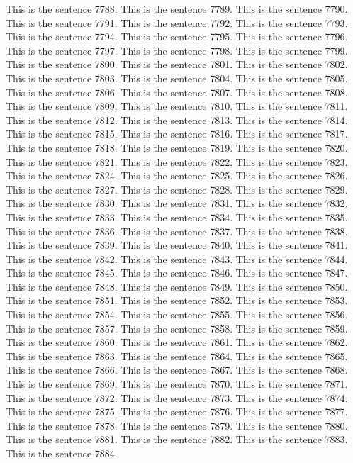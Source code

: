 \documentclass{article}
\begin{document}
This is the sentence 7788.
This is the sentence 7789.
This is the sentence 7790.
This is the sentence 7791.
This is the sentence 7792.
This is the sentence 7793.
This is the sentence 7794.
This is the sentence 7795.
This is the sentence 7796.
This is the sentence 7797.
This is the sentence 7798.
This is the sentence 7799.
This is the sentence 7800.
This is the sentence 7801.
This is the sentence 7802.
This is the sentence 7803.
This is the sentence 7804.
This is the sentence 7805.
This is the sentence 7806.
This is the sentence 7807.
This is the sentence 7808.
This is the sentence 7809.
This is the sentence 7810.
This is the sentence 7811.
This is the sentence 7812.
This is the sentence 7813.
This is the sentence 7814.
This is the sentence 7815.
This is the sentence 7816.
This is the sentence 7817.
This is the sentence 7818.
This is the sentence 7819.
This is the sentence 7820.
This is the sentence 7821.
This is the sentence 7822.
This is the sentence 7823.
This is the sentence 7824.
This is the sentence 7825.
This is the sentence 7826.
This is the sentence 7827.
This is the sentence 7828.
This is the sentence 7829.
This is the sentence 7830.
This is the sentence 7831.
This is the sentence 7832.
This is the sentence 7833.
This is the sentence 7834.
This is the sentence 7835.
This is the sentence 7836.
This is the sentence 7837.
This is the sentence 7838.
This is the sentence 7839.
This is the sentence 7840.
This is the sentence 7841.
This is the sentence 7842.
This is the sentence 7843.
This is the sentence 7844.
This is the sentence 7845.
This is the sentence 7846.
This is the sentence 7847.
This is the sentence 7848.
This is the sentence 7849.
This is the sentence 7850.
This is the sentence 7851.
This is the sentence 7852.
This is the sentence 7853.
This is the sentence 7854.
This is the sentence 7855.
This is the sentence 7856.
This is the sentence 7857.
This is the sentence 7858.
This is the sentence 7859.
This is the sentence 7860.
This is the sentence 7861.
This is the sentence 7862.
This is the sentence 7863.
This is the sentence 7864.
This is the sentence 7865.
This is the sentence 7866.
This is the sentence 7867.
This is the sentence 7868.
This is the sentence 7869.
This is the sentence 7870.
This is the sentence 7871.
This is the sentence 7872.
This is the sentence 7873.
This is the sentence 7874.
This is the sentence 7875.
This is the sentence 7876.
This is the sentence 7877.
This is the sentence 7878.
This is the sentence 7879.
This is the sentence 7880.
This is the sentence 7881.
This is the sentence 7882.
This is the sentence 7883.
This is the sentence 7884.
\end{document}
